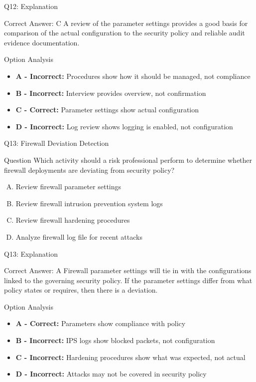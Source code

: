 \documentclass{beamer}
\begin{document}
	\begin{frame}{Q12: Explanation}
		\begin{block}{Correct Answer: C}
			A review of the parameter settings provides a good basis for comparison of the actual configuration to the security policy and reliable audit evidence documentation.
		\end{block}
		\begin{block}{Option Analysis}
			\begin{itemize}
				\item \textbf{A - Incorrect:} Procedures show how it should be managed, not compliance
				\item \textbf{B - Incorrect:} Interview provides overview, not confirmation
				\item \textbf{C - Correct:} Parameter settings show actual configuration
				\item \textbf{D - Incorrect:} Log review shows logging is enabled, not configuration
			\end{itemize}
		\end{block}
	\end{frame}
	
	\begin{frame}{Q13: Firewall Deviation Detection}
		\begin{block}{Question}
			Which activity should a risk professional perform to determine whether firewall deployments are deviating from security policy?
		\end{block}
		\begin{enumerate}[(A)]
			\item Review firewall parameter settings
			\item Review firewall intrusion prevention system logs
			\item Review firewall hardening procedures
			\item Analyze firewall log file for recent attacks
		\end{enumerate}
	\end{frame}
	
	\begin{frame}{Q13: Explanation}
		\begin{block}{Correct Answer: A}
			Firewall parameter settings will tie in with the configurations linked to the governing security policy. If the parameter settings differ from what policy states or requires, then there is a deviation.
		\end{block}
		\begin{block}{Option Analysis}
			\begin{itemize}
				\item \textbf{A - Correct:} Parameters show compliance with policy
				\item \textbf{B - Incorrect:} IPS logs show blocked packets, not configuration
				\item \textbf{C - Incorrect:} Hardening procedures show what was expected, not actual
				\item \textbf{D - Incorrect:} Attacks may not be covered in security policy
			\end{itemize}
		\end{block}
	\end{frame}
	
\end{document}
